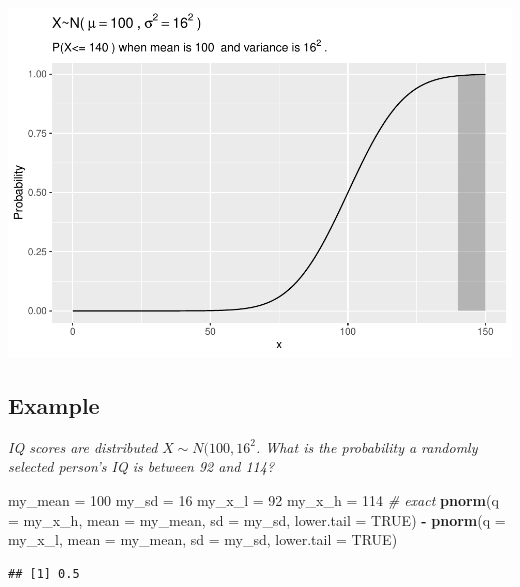 \documentclass[
]{book}
\newenvironment{Shaded}{\begin{snugshade}}{\end{snugshade}}
\newcommand{\CommentTok}[1]{\textcolor[rgb]{0.56,0.35,0.01}{\textit{#1}}}
\newcommand{\DataTypeTok}[1]{\textcolor[rgb]{0.13,0.29,0.53}{#1}}
\newcommand{\DecValTok}[1]{\textcolor[rgb]{0.00,0.00,0.81}{#1}}
\newcommand{\KeywordTok}[1]{\textcolor[rgb]{0.13,0.29,0.53}{\textbf{#1}}}
\newcommand{\NormalTok}[1]{#1}
\newcommand{\OperatorTok}[1]{\textcolor[rgb]{0.81,0.36,0.00}{\textbf{#1}}}
\newcommand{\OtherTok}[1]{\textcolor[rgb]{0.56,0.35,0.01}{#1}}
\newcommand{\StringTok}[1]{\textcolor[rgb]{0.31,0.60,0.02}{#1}}
\begin{document}
\includegraphics{data-sci_files/figure-latex/unnamed-chunk-22-1.pdf}

\hypertarget{example-12}{%
\subsection{Example}\label{example-12}}

\emph{IQ scores are distributed }\(X \sim N(100, 16^2\)\emph{. What is the probability a randomly selected person's IQ is between 92 and 114?}

\begin{Shaded}
\begin{Highlighting}[]
\NormalTok{my_mean =}\StringTok{ }\DecValTok{100}
\NormalTok{my_sd =}\StringTok{ }\DecValTok{16}
\NormalTok{my_x_l =}\StringTok{ }\DecValTok{92}
\NormalTok{my_x_h =}\StringTok{ }\DecValTok{114}
\CommentTok{# exact}
\KeywordTok{pnorm}\NormalTok{(}\DataTypeTok{q =}\NormalTok{ my_x_h, }\DataTypeTok{mean =}\NormalTok{ my_mean, }\DataTypeTok{sd =}\NormalTok{ my_sd, }\DataTypeTok{lower.tail =} \OtherTok{TRUE}\NormalTok{) }\OperatorTok{-}
\StringTok{  }\KeywordTok{pnorm}\NormalTok{(}\DataTypeTok{q =}\NormalTok{ my_x_l, }\DataTypeTok{mean =}\NormalTok{ my_mean, }\DataTypeTok{sd =}\NormalTok{ my_sd, }\DataTypeTok{lower.tail =} \OtherTok{TRUE}\NormalTok{)}
\end{Highlighting}
\end{Shaded}

\begin{verbatim}
## [1] 0.5
\end{verbatim}
\end{document}
